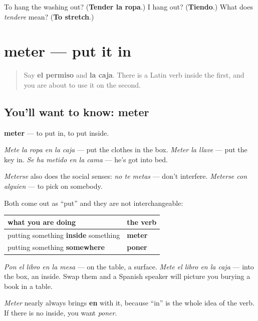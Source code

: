 \begin{tcolorbox}[breakable,colback=teal!4,colframe=teal!35!black,title={Before you move on}]
To hang the washing out? (\textbf{Tender la ropa}.) I hang out? (\textbf{Tiendo}.) What does \emph{tendere} mean? (\textbf{To stretch}.)
\end{tcolorbox}
\section[meter]{meter — put it in}

\label{lesson:ES-C455-meter}



\begin{quote}
Say \textbf{el permiso} and \textbf{la caja}. There is a Latin verb inside the first, and you are about to use it on the second.
\end{quote}

\subsection*{You'll want to know: meter}
\textbf{meter} — to put in, to put inside.

\emph{Mete la ropa en la caja} — put the clothes in the box. \emph{Meter la llave} — put the key in. \emph{Se ha metido en la cama} — he's got into bed.

\emph{Meterse} also does the social senses: \emph{no te metas} — don't interfere. \emph{Meterse con alguien} — to pick on somebody.

\begin{grammarlens}[title={Grammar Lens: meter is not poner}]
Both come out as \textquotedblleft{}put\textquotedblright{} and they are not interchangeable:

\noindent
\begin{tabularx}{\linewidth}{@{}>{\raggedright\arraybackslash}X>{\raggedright\arraybackslash}X@{}}
\toprule
\textbf{what you are doing} & \textbf{the verb} \\
\midrule
putting something \textbf{inside} something & \textbf{meter} \\
putting something \textbf{somewhere} & \textbf{poner} \\
\bottomrule
\end{tabularx}

\emph{Pon el libro en la mesa} — on the table, a surface. \emph{Mete el libro en la caja} — into the box, an inside. Swap them and a Spanish speaker will picture you burying a book in a table.

\emph{Meter} nearly always brings \textbf{en} with it, because \textquotedblleft{}in\textquotedblright{} is the whole idea of the verb. If there is no inside, you want \emph{poner}.
\end{grammarlens}

